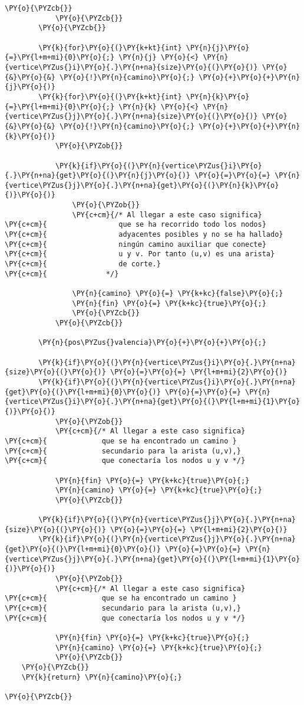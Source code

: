 \begin{Verbatim}[commandchars=\\\{\}]
				\PY{o}{\PYZcb{}}
			\PY{o}{\PYZcb{}}
		\PY{o}{\PYZcb{}}
		
	    \PY{k}{for}\PY{o}{(}\PY{k+kt}{int} \PY{n}{j}\PY{o}{=}\PY{l+m+mi}{0}\PY{o}{;} \PY{n}{j} \PY{o}{<} \PY{n}{vertice\PYZus{}i}\PY{o}{.}\PY{n+na}{size}\PY{o}{(}\PY{o}{)} \PY{o}{&}\PY{o}{&} \PY{o}{!}\PY{n}{camino}\PY{o}{;} \PY{o}{+}\PY{o}{+}\PY{n}{j}\PY{o}{)}
		\PY{k}{for}\PY{o}{(}\PY{k+kt}{int} \PY{n}{k}\PY{o}{=}\PY{l+m+mi}{0}\PY{o}{;} \PY{n}{k} \PY{o}{<} \PY{n}{vertice\PYZus{}j}\PY{o}{.}\PY{n+na}{size}\PY{o}{(}\PY{o}{)} \PY{o}{&}\PY{o}{&} \PY{o}{!}\PY{n}{camino}\PY{o}{;} \PY{o}{+}\PY{o}{+}\PY{n}{k}\PY{o}{)}
		    \PY{o}{\PYZob{}}
		
			\PY{k}{if}\PY{o}{(}\PY{n}{vertice\PYZus{}i}\PY{o}{.}\PY{n+na}{get}\PY{o}{(}\PY{n}{j}\PY{o}{)} \PY{o}{=}\PY{o}{=} \PY{n}{vertice\PYZus{}j}\PY{o}{.}\PY{n+na}{get}\PY{o}{(}\PY{n}{k}\PY{o}{)}\PY{o}{)}
			    \PY{o}{\PYZob{}}
				\PY{c+cm}{/* Al llegar a este caso significa}
\PY{c+cm}{				   que se ha recorrido todo los nodos}
\PY{c+cm}{				   adyacentes posibles y no se ha hallado}
\PY{c+cm}{				   ningún camino auxiliar que conecte}
\PY{c+cm}{				   u y v. Por tanto (u,v) es una arista}
\PY{c+cm}{				   de corte.}
\PY{c+cm}{				*/}

				\PY{n}{camino} \PY{o}{=} \PY{k+kc}{false}\PY{o}{;}
				\PY{n}{fin} \PY{o}{=} \PY{k+kc}{true}\PY{o}{;}
			    \PY{o}{\PYZcb{}}
		    \PY{o}{\PYZcb{}}
	
	    \PY{n}{pos\PYZus{}valencia}\PY{o}{+}\PY{o}{+}\PY{o}{;}

	    \PY{k}{if}\PY{o}{(}\PY{n}{vertice\PYZus{}i}\PY{o}{.}\PY{n+na}{size}\PY{o}{(}\PY{o}{)} \PY{o}{=}\PY{o}{=} \PY{l+m+mi}{2}\PY{o}{)}
		\PY{k}{if}\PY{o}{(}\PY{n}{vertice\PYZus{}i}\PY{o}{.}\PY{n+na}{get}\PY{o}{(}\PY{l+m+mi}{0}\PY{o}{)} \PY{o}{=}\PY{o}{=} \PY{n}{vertice\PYZus{}i}\PY{o}{.}\PY{n+na}{get}\PY{o}{(}\PY{l+m+mi}{1}\PY{o}{)}\PY{o}{)}
		    \PY{o}{\PYZob{}}
			\PY{c+cm}{/* Al llegar a este caso significa}
\PY{c+cm}{			   que se ha encontrado un camino }
\PY{c+cm}{			   secundario para la arista (u,v),}
\PY{c+cm}{			   que conectaría los nodos u y v */}

			\PY{n}{fin} \PY{o}{=} \PY{k+kc}{true}\PY{o}{;}
			\PY{n}{camino} \PY{o}{=} \PY{k+kc}{true}\PY{o}{;}
		    \PY{o}{\PYZcb{}}

	    \PY{k}{if}\PY{o}{(}\PY{n}{vertice\PYZus{}j}\PY{o}{.}\PY{n+na}{size}\PY{o}{(}\PY{o}{)} \PY{o}{=}\PY{o}{=} \PY{l+m+mi}{2}\PY{o}{)}
		\PY{k}{if}\PY{o}{(}\PY{n}{vertice\PYZus{}j}\PY{o}{.}\PY{n+na}{get}\PY{o}{(}\PY{l+m+mi}{0}\PY{o}{)} \PY{o}{=}\PY{o}{=} \PY{n}{vertice\PYZus{}j}\PY{o}{.}\PY{n+na}{get}\PY{o}{(}\PY{l+m+mi}{1}\PY{o}{)}\PY{o}{)}
		    \PY{o}{\PYZob{}}
			\PY{c+cm}{/* Al llegar a este caso significa}
\PY{c+cm}{			   que se ha encontrado un camino }
\PY{c+cm}{			   secundario para la arista (u,v),}
\PY{c+cm}{			   que conectaría los nodos u y v */}

			\PY{n}{fin} \PY{o}{=} \PY{k+kc}{true}\PY{o}{;}
			\PY{n}{camino} \PY{o}{=} \PY{k+kc}{true}\PY{o}{;}
		    \PY{o}{\PYZcb{}}
	\PY{o}{\PYZcb{}}
    \PY{k}{return} \PY{n}{camino}\PY{o}{;}
		
\PY{o}{\PYZcb{}}
\end{Verbatim}
